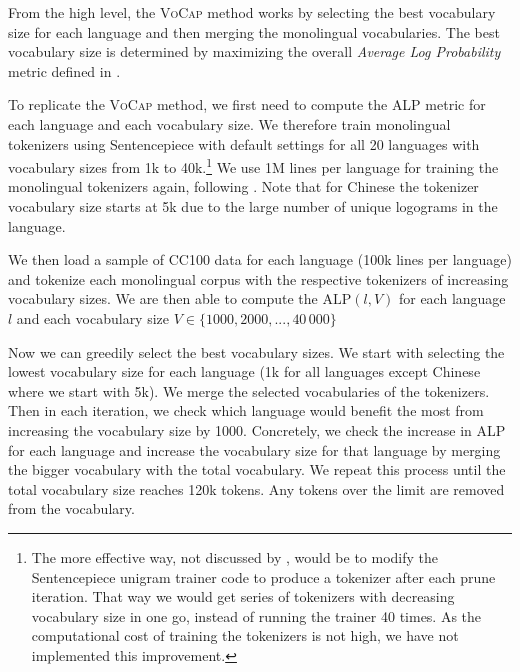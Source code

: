 
From the high level, the \textsc{VoCap} method works by selecting the best vocabulary size for each language and then merging the monolingual vocabularies. The best vocabulary size is determined by maximizing the overall \textit{Average Log Probability} metric defined in . 

To replicate the \textsc{VoCap} method, we first need to compute the \textsc{ALP} metric for each language and each vocabulary size. We therefore train monolingual tokenizers using Sentencepiece with default settings for all 20 languages with vocabulary sizes from 1k to 40k.\footnote{The more effective way, not discussed by \citet{zheng_allocating_2021}, would be to modify the Sentencepiece unigram trainer code to produce a tokenizer after each prune iteration. That way we would get series of tokenizers with decreasing vocabulary size in one go, instead of running the trainer 40 times. As the computational cost of training the tokenizers is not high, we have not implemented this improvement.} We use 1M lines per language for training the monolingual tokenizers again, following \citet{zheng_allocating_2021}. Note that for Chinese the tokenizer vocabulary size starts at 5k due to the large number of unique logograms in the language. 


We then load a sample of CC100 data for each language (100k lines per language) and tokenize each monolingual corpus with the respective tokenizers of increasing vocabulary sizes. We are then able to compute the $\mathrm{ALP}(l, V)$  for each language $l$ and each vocabulary size $V \in \{1000, 2000, ..., 40\,000\}$

Now we can greedily select the best vocabulary sizes. We start with selecting the lowest vocabulary size for each language (1k for all languages except Chinese where we start with 5k). We merge the selected vocabularies of the tokenizers. Then in each iteration, we check which language would benefit the most from increasing the vocabulary size by 1000. Concretely, we check the increase in ALP for each language and increase the vocabulary size for that language by merging the bigger vocabulary with the total vocabulary. We repeat this process until the total vocabulary size reaches 120k tokens. Any tokens over the limit are removed from the vocabulary.


